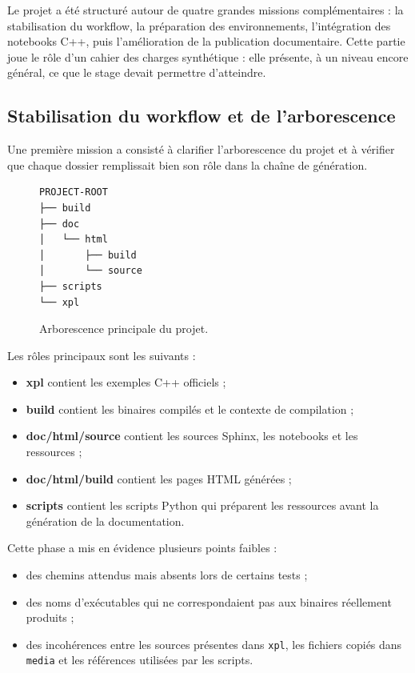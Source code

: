 \documentclass[a4paper,12pt,twoside]{article}
\begin{document}
Le projet a été structuré autour de quatre grandes missions complémentaires : la stabilisation du workflow, la préparation des environnements, l'intégration des notebooks C++, puis l'amélioration de la publication documentaire. Cette partie joue le rôle d'un cahier des charges synthétique : elle présente, à un niveau encore général, ce que le stage devait permettre d'atteindre.

\subsection{Stabilisation du workflow et de l'arborescence}

Une première mission a consisté à clarifier l'arborescence du projet et à vérifier que chaque dossier remplissait bien son rôle dans la chaîne de génération.

\begin{figure}[h]
\centering
\begin{minipage}{0.88\textwidth}
\begin{verbatim}
PROJECT-ROOT
├── build
├── doc
│   └── html
│       ├── build
│       └── source
├── scripts
└── xpl
\end{verbatim}
\end{minipage}
\caption{Arborescence principale du projet.}
\end{figure}

Les rôles principaux sont les suivants :
\begin{itemize}
    \item \textbf{xpl} contient les exemples C++ officiels ;
    \item \textbf{build} contient les binaires compilés et le contexte de compilation ;
    \item \textbf{doc/html/source} contient les sources Sphinx, les notebooks et les ressources ;
    \item \textbf{doc/html/build} contient les pages HTML générées ;
    \item \textbf{scripts} contient les scripts Python qui préparent les ressources avant la génération de la documentation.
\end{itemize}

Cette phase a mis en évidence plusieurs points faibles :
\begin{itemize}
    \item des chemins attendus mais absents lors de certains tests ;
    \item des noms d'exécutables qui ne correspondaient pas aux binaires réellement produits ;
    \item des incohérences entre les sources présentes dans \texttt{xpl}, les fichiers copiés dans \texttt{media} et les références utilisées par les scripts.
\end{itemize}
\end{document}
